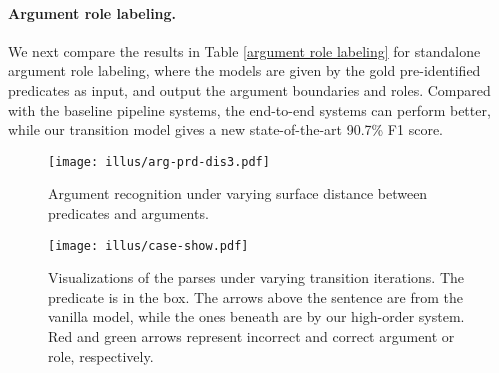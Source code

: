 \documentclass[letterpaper]{article} %
\begin{document}
\begin{CJK}{UTF8}{gbsn}
\paragraph{Argument role labeling.}

We next compare the results in Table \ref{argument role labeling} for standalone argument role labeling, where the models are given by the gold pre-identified predicates as input,
and output the argument boundaries and roles.
Compared with the baseline pipeline systems, the end-to-end systems can perform better, while our transition model gives a new state-of-the-art 90.7\% F1 score.






\begin{figure}[!t]
\centering \texttt{[image: illus/arg-prd-dis3.pdf]}
\caption{
Argument recognition under varying surface distance between predicates and arguments.
}
\label{distance}
\end{figure}







\begin{table}[!t]
\begin{center}
\end{center}
\caption{
  Results with contextualized word representation.
  }
  \label{LM}
\end{table}


\begin{figure}[!t]
\centering \texttt{[image: illus/case-show.pdf]}
\caption{
Visualizations of the parses under varying transition iterations.
The predicate is in the box.
The arrows above the sentence are from the vanilla model, while the ones beneath are by our high-order system.
Red and green arrows represent incorrect and correct argument or role, respectively.
}
\label{case}
\end{figure}







\end{CJK}
\end{document}
